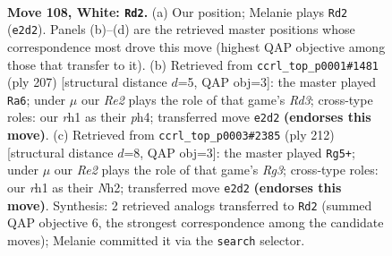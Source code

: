 \documentclass[11pt]{article}
\begin{document}
\clearpage

\begin{figure}[p]\centering
\begin{subfigure}{0.46\textwidth}\centering
\resizebox{\linewidth}{!}{%
\newchessgame
\chessboard[
  setfen={8/5k2/8/8/8/r7/4RK2/7r w - - 26 108},
  showmover=false,
  pgfstyle=straightmove, color=movearrow, markmove={e2-d2}
]}
\caption{}
\end{subfigure}\hfill
\begin{subfigure}{0.46\textwidth}\centering
\resizebox{\linewidth}{!}{%
\newchessgame
\chessboard[
  setfen={5K2/3k4/3r4/8/7P/6p1/8/4R3 b - - 15 104},
  showmover=false,
  pgfstyle=straightmove, color=movearrow, markmove={d6-a6}
]}
\caption{}
\end{subfigure}
\\[4pt]
\begin{subfigure}{0.46\textwidth}\centering
\resizebox{\linewidth}{!}{%
\newchessgame
\chessboard[
  setfen={8/5r2/8/4k3/8/6RK/r6N/8 w - - 84 107},
  showmover=false,
  pgfstyle=straightmove, color=movearrow, markmove={g3-g5}
]}
\caption{}
\end{subfigure}\hfill

\caption{\textbf{Move 108, White: \texttt{Rd2}.} (a) Our position; Melanie plays \texttt{Rd2} (\texttt{e2d2}). Panels (b)--(d) are the retrieved master positions whose correspondence most drove this move (highest QAP objective among those that transfer to it). (b) Retrieved from \texttt{ccrl\_top\_p0001\#1481} (ply 207) [structural distance $d$=5, QAP obj=3]: the master played \texttt{Ra6}; under $\mu$ our \emph{Re2} plays the role of that game's \emph{Rd3}; cross-type roles: our \emph{r}h1 as their \emph{p}h4; transferred move \texttt{e2d2} \textbf{(endorses this move)}. (c) Retrieved from \texttt{ccrl\_top\_p0003\#2385} (ply 212) [structural distance $d$=8, QAP obj=3]: the master played \texttt{Rg5+}; under $\mu$ our \emph{Re2} plays the role of that game's \emph{Rg3}; cross-type roles: our \emph{r}h1 as their \emph{N}h2; transferred move \texttt{e2d2} \textbf{(endorses this move)}. Synthesis: 2 retrieved analogs transferred to \texttt{Rd2} (summed QAP objective 6, the strongest correspondence among the candidate moves); Melanie committed it via the \texttt{search} selector.}
\label{fig:thought-m214}
\end{figure}

\clearpage
\end{document}
